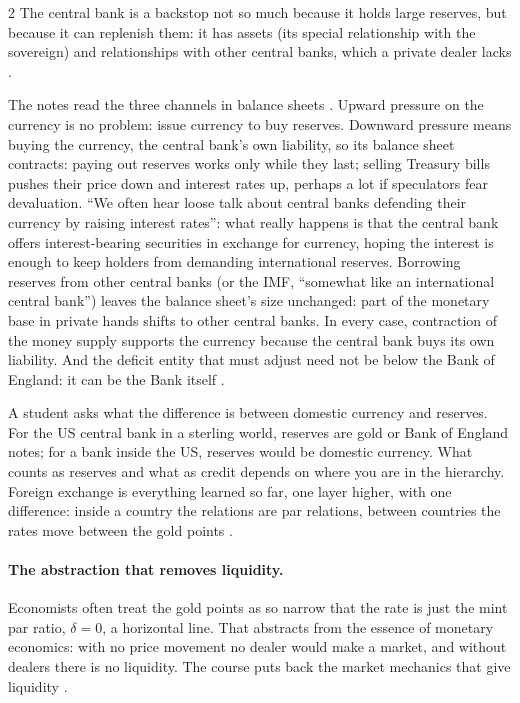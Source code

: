\begin{paracol}{2}
The central bank is a backstop not so much because it holds large reserves, but because it can replenish them: it has assets (its special relationship with the
sovereign) and relationships with other central banks, which a private dealer lacks .

\begin{intuition}
The notes read the three channels in balance sheets . Upward pressure on the currency is no problem: issue currency to buy reserves. Downward pressure means buying the
currency, the central bank's own liability, so its balance sheet contracts: paying out reserves works only while they last; selling Treasury bills pushes their price down and interest rates up,
perhaps a lot if speculators fear devaluation. ``We often hear loose talk about central banks defending their currency by raising interest rates'': what really happens is that the central bank
offers interest-bearing securities in exchange for currency, hoping the interest is enough to keep holders from demanding international reserves. Borrowing reserves from other central banks
(or the IMF, ``somewhat like an international central bank'') leaves the balance sheet's size unchanged: part of the monetary base in private hands shifts to other central banks. In every
case, contraction of the money supply supports the currency because the central bank buys its own liability. And the deficit entity that must adjust need not be below the Bank of England: it
can be the Bank itself .
\end{intuition}

\begin{intuition}
A student asks what the difference is between domestic currency and reserves. For the US central bank in a sterling world, reserves are gold or Bank of England
notes; for a bank inside the US, reserves would be domestic currency. What counts as reserves and what as credit depends on where you are in the hierarchy.
Foreign exchange is everything learned so far, one layer higher, with one difference: inside a country the relations are par relations, between countries the
rates move between the gold points .
\end{intuition}

\paragraph{The abstraction that removes liquidity.} Economists often treat the gold points as so narrow that the rate is just the mint par ratio, $\delta=0$, a
horizontal line. That abstracts from the essence of monetary economics: with no price movement no dealer would make a market, and without dealers there is no
liquidity. The course puts back the market mechanics that give liquidity .


\end{paracol}
